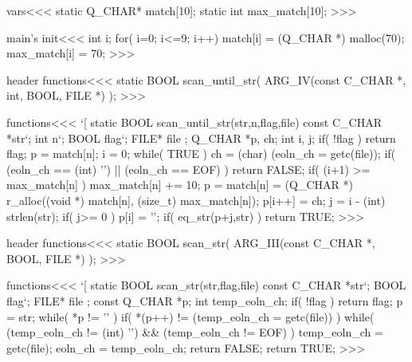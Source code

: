 {{{{{{{\<vars\><<<
static Q_CHAR* match[10];
static int   max_match[10];
>>>


\<main's init\><<<
{          int i;
  for( i=0;  i<=9; i++){
    match[i] = (Q_CHAR *) malloc(70);
    max_match[i] = 70;
  }
}
>>>


\<header functions\><<<
static BOOL scan_until_str( ARG_IV(const C_CHAR *, int, BOOL, FILE *) );
>>>

\<functions\><<<
`[
static BOOL  scan_until_str(str,n,flag,file)     
                         const C_CHAR   *str`;
                         int    n`;
                         BOOL   flag`;
                         FILE*  file
;{                       Q_CHAR   *p, ch;              
                         int i, j;             
   if( !flag ) { return flag; }
   p = match[n];  i = 0;
   while( TRUE ){
     ch =  (char) (eoln_ch = getc(file));
     if( (eoln_ch == (int) '\n') || (eoln_ch == EOF) ){  return FALSE; }
     if( (i+1) >= max_match[n] ){
        max_match[n] += 10;
        p = match[n] = (Q_CHAR *)
                     r_alloc((void *) match[n], (size_t) max_match[n]);
     }
     p[i++] = ch;
     j =  i - (int) strlen(str);
     if( j>= 0 ){
       p[i] = '\0';
       if( eq_str(p+j,str) ) { return TRUE;  }
     }
   }
}
>>>






\<header functions\><<<
static BOOL scan_str( ARG_III(const C_CHAR *, BOOL, FILE *) );
>>>

\<functions\><<<
`[
static BOOL  scan_str(str,flag,file)     
                         const C_CHAR   *str`;
                         BOOL   flag`;
                         FILE*  file
;{                        const Q_CHAR *p;
                         int temp_eoln_ch;              
   if( !flag ) { return flag; }
   p = str;
   while( *p != '\0' ){
     if( *(p++) != (temp_eoln_ch = getc(file)) ) {
        while( (temp_eoln_ch != (int) '\n')
            && (temp_eoln_ch != EOF) ){ temp_eoln_ch = getc(file); }
        eoln_ch = temp_eoln_ch;  return FALSE;
     }
   }
   return TRUE;
}
>>>
































}}}}}}}
